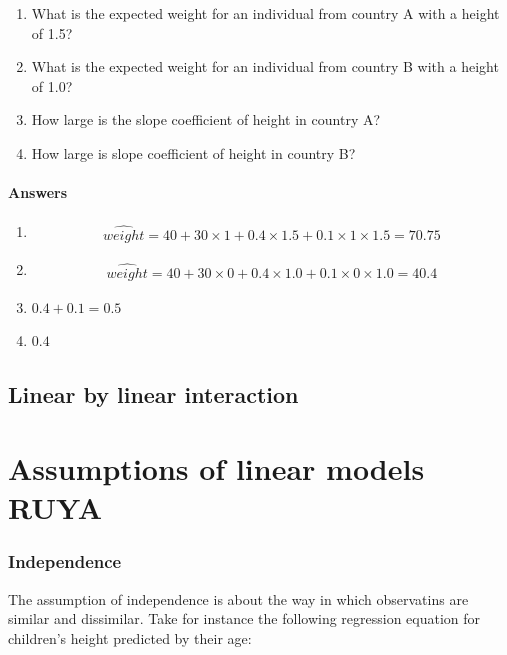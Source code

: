 \documentclass[]{report}\usepackage[]{graphicx}\usepackage[]{color}
\begin{document}
\begin{enumerate}
\item What is the expected weight for an individual from country A with a height of 1.5?\\
\item What is the expected weight for an individual from country B with a height of 1.0?\\
\item How large is the slope coefficient of height in country A? \\
\item How large is slope coefficient of height in country B?\\
\end{enumerate}

\subsubsection{Answers}
\begin{enumerate}

\item 
\begin{eqnarray}
\widehat{weight}= 40 + 30 \times 1 + 0.4\times 1.5 + 0.1 \times 1\times 1.5 =70.75 \nonumber
\end{eqnarray}

\item
\begin{eqnarray}
\widehat{weight}= 40 + 30 \times 0 + 0.4\times 1.0 + 0.1 \times 0\times 1.0 =40.4\nonumber
\end{eqnarray}


\item{$0.4 + 0.1 = 0.5$}

\item{$0.4$}


\end{enumerate}


\section{Linear by linear interaction}


\chapter{Assumptions of linear models RUYA}
\subsection{Independence}
The assumption of independence is about the way in which observatins are similar and dissimilar. Take for instance the following regression equation for children's height predicted by their age:
\end{document}
